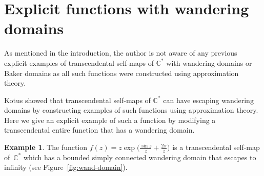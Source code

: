 \documentclass[a4paper, 12pt, reqno]{amsart}
\newcommand{\margin}[1]{\marginnote{\red{#1}}}
\numberwithin{equation}{section}
\newcommand{\red}[1]{{\color{red} #1}}
\theoremstyle{plain}
\theoremstyle{definition}
\newtheorem{dfn}[thm]{Definition}
\newtheorem{ex}[thm]{Example}
\theoremstyle{remark}
\newcommand{\C}{{\mathbb{C}}}
\newcommand{\N}{{\mathbb{N}}}
\begin{document}


\section{Explicit functions with wandering domains}

\label{sec:explicit-wd}

As mentioned in the introduction, the author is not aware of any previous explicit examples of transcendental self-maps of $\C^*$ with wandering domains or Baker domains as all such functions were constructed using approximation theory.


Kotus \cite{kotus90} showed that transcendental self-maps of $\C^*$ can have escaping wandering domains by constructing examples of such functions using approximation theory. Here we give an explicit example of such a function by modifying a transcendental entire function that has a wandering domain. 

\begin{ex}
The function $f(z)=z\exp\bigl(\frac{\sin z}{z}+\frac{2\pi}{z}\bigr)$ is a transcendental self-map of~$\C^*$ which has a bounded simply connected wandering domain that escapes to infi\-nity (see Figure~\ref{fig:wand-domain}).
\label{ex:wand-domain}
\end{ex}
\end{document}
